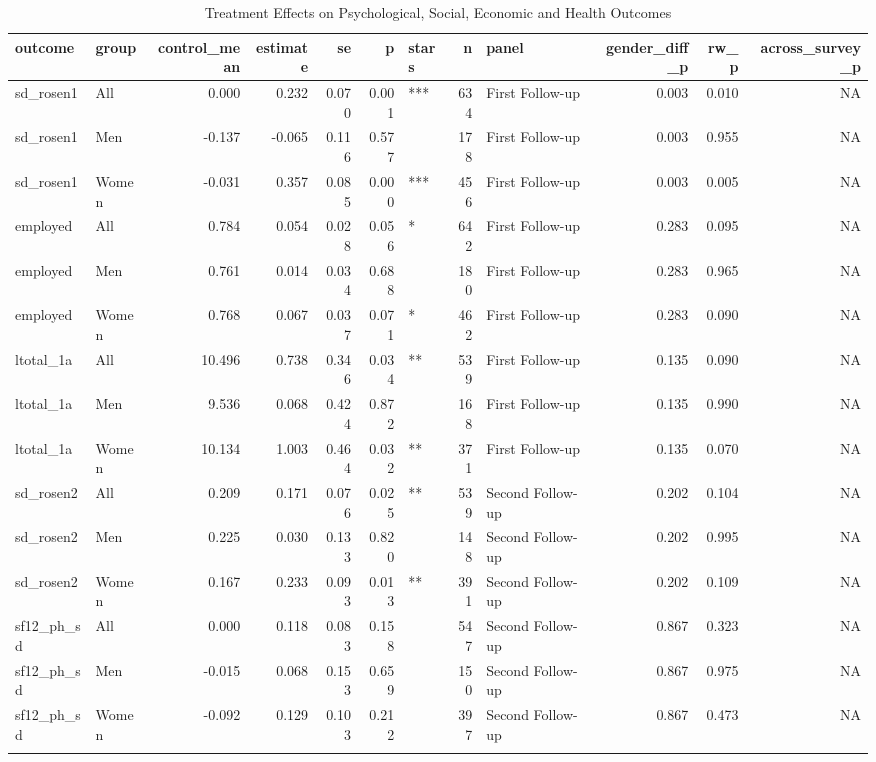\begin{table}

\caption{Treatment Effects on Psychological, Social, Economic and Health Outcomes}
\centering
\begin{tabular}[t]{llrrrrlrlrrr}
\toprule
outcome & group & control\_mean & estimate & se & p & stars & n & panel & gender\_diff\_p & rw\_p & across\_survey\_p\\
\midrule
sd\_rosen1 & All & 0.000 & 0.232 & 0.070 & 0.001 & *** & 634 & First Follow-up & 0.003 & 0.010 & NA\\
sd\_rosen1 & Men & -0.137 & -0.065 & 0.116 & 0.577 &  & 178 & First Follow-up & 0.003 & 0.955 & NA\\
sd\_rosen1 & Women & -0.031 & 0.357 & 0.085 & 0.000 & *** & 456 & First Follow-up & 0.003 & 0.005 & NA\\
employed & All & 0.784 & 0.054 & 0.028 & 0.056 & * & 642 & First Follow-up & 0.283 & 0.095 & NA\\
employed & Men & 0.761 & 0.014 & 0.034 & 0.688 &  & 180 & First Follow-up & 0.283 & 0.965 & NA\\
\addlinespace
employed & Women & 0.768 & 0.067 & 0.037 & 0.071 & * & 462 & First Follow-up & 0.283 & 0.090 & NA\\
ltotal\_1a & All & 10.496 & 0.738 & 0.346 & 0.034 & ** & 539 & First Follow-up & 0.135 & 0.090 & NA\\
ltotal\_1a & Men & 9.536 & 0.068 & 0.424 & 0.872 &  & 168 & First Follow-up & 0.135 & 0.990 & NA\\
ltotal\_1a & Women & 10.134 & 1.003 & 0.464 & 0.032 & ** & 371 & First Follow-up & 0.135 & 0.070 & NA\\
sd\_rosen2 & All & 0.209 & 0.171 & 0.076 & 0.025 & ** & 539 & Second Follow-up & 0.202 & 0.104 & NA\\
\addlinespace
sd\_rosen2 & Men & 0.225 & 0.030 & 0.133 & 0.820 &  & 148 & Second Follow-up & 0.202 & 0.995 & NA\\
sd\_rosen2 & Women & 0.167 & 0.233 & 0.093 & 0.013 & ** & 391 & Second Follow-up & 0.202 & 0.109 & NA\\
sf12\_ph\_sd & All & 0.000 & 0.118 & 0.083 & 0.158 &  & 547 & Second Follow-up & 0.867 & 0.323 & NA\\
sf12\_ph\_sd & Men & -0.015 & 0.068 & 0.153 & 0.659 &  & 150 & Second Follow-up & 0.867 & 0.975 & NA\\
sf12\_ph\_sd & Women & -0.092 & 0.129 & 0.103 & 0.212 &  & 397 & Second Follow-up & 0.867 & 0.473 & NA\\
\addlinespace

\end{tabular}
\end{table}
